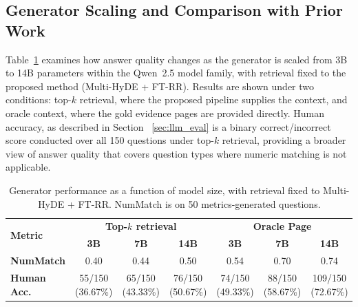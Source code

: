 \documentclass[12pt,twoside,maitrise]{dms}
\theoremstyle{definition}
\numberwithin{equation}{section}
\numberwithin{table}{chapter}
\numberwithin{figure}{chapter}
\begin{document}
\subsection{Generator Scaling and Comparison with Prior Work}
\label{sec:gen_scaling}

Table~\ref{tab:scaling} examines how answer quality changes as the generator is scaled
from 3B to 14B parameters within the Qwen~2.5 model family, with retrieval fixed to the
proposed method (Multi-HyDE + FT-RR). Results are shown under two conditions: top-$k$
retrieval, where the proposed pipeline supplies the context, and oracle context, where
the gold evidence pages are provided directly. Human accuracy, as described in Section ~\ref{sec:llm_eval} is a binary
correct/incorrect score conducted over all 150 questions under top-$k$ retrieval,
providing a broader view of answer quality that covers question types where numeric
matching is not applicable.

\begin{table}[ht]
\centering
\small
\setlength{\tabcolsep}{4pt} %

\begin{tabular}{l ccc ccc}
\toprule
\multirow{2}{*}{\textbf{Metric}} 
  & \multicolumn{3}{c}{\textbf{Top-$k$ retrieval}} 
  & \multicolumn{3}{c}{\textbf{Oracle Page}} \\
\cmidrule(lr){2-4} \cmidrule(lr){5-7}
  & \textbf{3B} & \textbf{7B} & \textbf{14B} 
  & \textbf{3B} & \textbf{7B} & \textbf{14B} \\
\midrule
\textbf{NumMatch} 
  & 0.40 & 0.44 & 0.50 
  & 0.54 & 0.70 & 0.74 \\
\addlinespace
\textbf{Human Acc.} 
  & \makecell{55/150\\(36.67\%)} & \makecell{65/150\\(43.33\%)} & \makecell{76/150\\(50.67\%)} 
  & \makecell{74/150\\(49.33\%)} & \makecell{88/150\\(58.67\%)} & \makecell{109/150\\(72.67\%)} \\
\bottomrule
\end{tabular}

\caption{Generator performance as a function of model size, with retrieval fixed to
  Multi-HyDE + FT-RR. NumMatch is on 50 metrics-generated questions.}
\label{tab:scaling}
\end{table}
\end{document}
